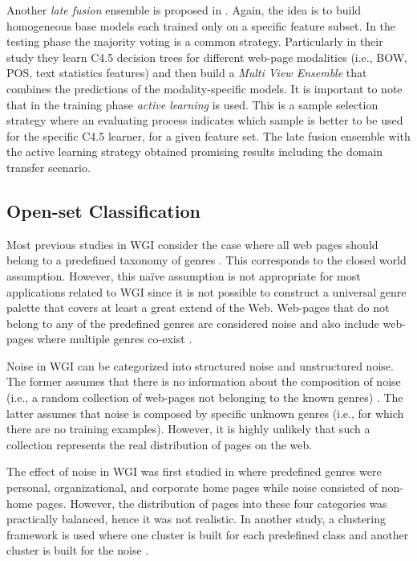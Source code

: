 Another \textit{late fusion} ensemble is proposed in \parencite{finn2006learning}. Again, the idea is to build homogeneous base models each trained only on a specific feature subset. In the testing phase the majority voting is a common strategy. Particularly in their study they learn C4.5 decision trees for different web-page modalities (i.e., BOW, POS, text statistics features) and then build a \textit{Multi View Ensemble} that combines the predictions of the modality-specific models. It is important to note that in the training phase \textit{active learning} is used. This is a sample selection strategy where an evaluating process indicates which sample is better to be used for the specific C4.5 learner, for a given feature set. The late fusion ensemble with the active learning strategy obtained promising results including the domain transfer scenario.

\subsection{Open-set Classification}\label{chap:relevant_work:sec:openset_and_noise}

Most previous studies in WGI consider the case where all web pages should belong to a predefined taxonomy of genres \parencite{Lim2005,santini2007automatic,kanaris2009learning,jebari2014pureURL}. This corresponds to the closed world assumption. However, this naïve assumption is not appropriate for most applications related to WGI since it is not possible to construct a universal genre palette that covers at least a great extend of the Web. Web-pages that do not belong to any of the predefined genres are considered noise and also include web-pages where multiple genres co-exist \parencite{santini2011cross,levering2008using}. 

Noise in WGI can be categorized into structured noise and  unstructured noise. The former assumes that there is no information about the composition of noise (i.e., a random collection of web-pages not belonging to the known genres) \parencite{santini2011cross}. The latter assumes that noise is composed by specific unknown genres (i.e., for which there are no training examples). However, it is highly unlikely that such a collection  represents the real distribution of pages on the web.

The effect of noise in WGI  was first studied in \parencite{shepherd2004cybergenre,kennedy2005automatic} where predefined genres were personal, organizational, and corporate home pages while noise consisted of non-home pages. However, the distribution of pages into these four categories was practically balanced, hence it was not realistic. In another study, a clustering framework is used where one cluster is built for each predefined class and another cluster is built for the noise \parencite{kennedy2005automatic}. 


